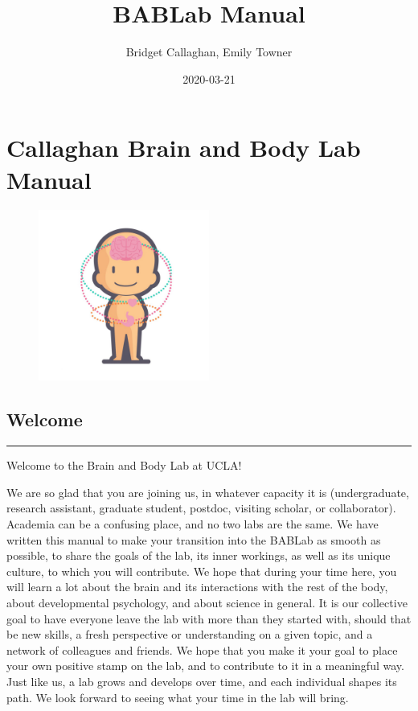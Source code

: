 \documentclass[]{book}
\title{BABLab Manual}
\author{Bridget Callaghan, Emily Towner}
\date{2020-03-21}
\begin{document}
\maketitle

{
\setcounter{tocdepth}{1}
\tableofcontents
}
\hypertarget{callaghan-brain-and-body-lab-manual}{%
\chapter{Callaghan Brain and Body Lab Manual}\label{callaghan-brain-and-body-lab-manual}}

\begin{figure}
\centering
\includegraphics[width=0.5\textwidth,height=0.5\textheight]{images/index/Icon.jpg}
\caption{}
\end{figure}

\hypertarget{welcome}{%
\section{Welcome}\label{welcome}}

\begin{center}\rule{0.5\linewidth}{\linethickness}\end{center}

Welcome to the Brain and Body Lab at UCLA!

We are so glad that you are joining us, in whatever capacity it is (undergraduate, research assistant, graduate student, postdoc, visiting scholar, or collaborator). Academia can be a confusing place, and no two labs are the same. We have written this manual to make your transition into the BABLab as smooth as possible, to share the goals of the lab, its inner workings, as well as its unique culture, to which you will contribute. We hope that during your time here, you will learn a lot about the brain and its interactions with the rest of the body, about developmental psychology, and about science in general. It is our collective goal to have everyone leave the lab with more than they started with, should that be new skills, a fresh perspective or understanding on a given topic, and a network of colleagues and friends. We hope that you make it your goal to place your own positive stamp on the lab, and to contribute to it in a meaningful way. Just like us, a lab grows and develops over time, and each individual shapes its path. We look forward to seeing what your time in the lab will bring.
\end{document}
